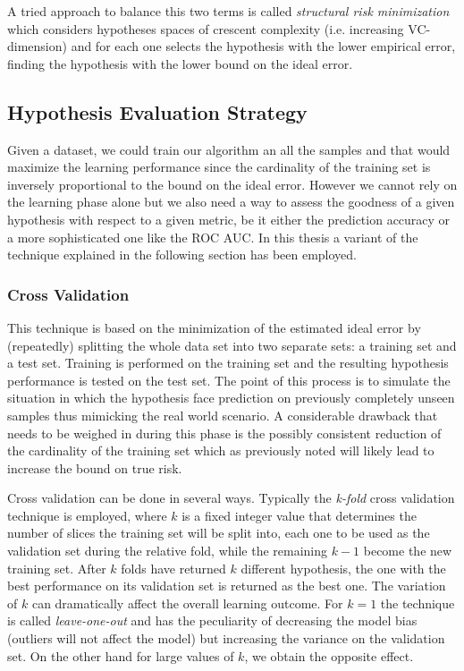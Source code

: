 A tried approach to balance this two terms is called \emph{structural risk
minimization} which considers hypotheses spaces of crescent complexity
(i.e. increasing VC-dimension) and for each one selects the hypothesis with
the lower empirical error, finding the hypothesis with the lower bound on the
ideal error.

\subsection{Hypothesis Evaluation Strategy}
\label{subsec:evaluation}

Given a dataset, we could train our algorithm an all the samples and that would
maximize the learning performance since the cardinality of the training set is
inversely proportional to the bound on the ideal error.
However we cannot rely on the learning phase alone but we also need a way to
assess the goodness of a given hypothesis with respect to a given metric, be it 
either the prediction accuracy or a more sophisticated one like the ROC AUC.
In this thesis a variant of the technique explained in the following section
has been employed.

\subsubsection{Cross Validation}
\label{subsubsec:cv}
This technique is based on the minimization of the estimated ideal error by
(repeatedly) splitting the whole data set into two separate sets: a training set
and a test set.
Training is performed on the training set and the resulting hypothesis performance
is tested on the test set.
The point of this process is to simulate the situation in which the hypothesis
face prediction on previously completely unseen samples thus mimicking the real
world scenario.
A considerable drawback that needs to be weighed in during this phase is the 
possibly consistent reduction of the cardinality of the training set which as 
previously noted will likely lead to increase the bound on true risk.

Cross validation can be done in several ways. Typically the \emph{k-fold} cross
validation technique is employed, where $k$ is a fixed integer value that
determines the number of slices the training set will be split into, each one to
be used as the validation set during the relative fold, while the remaining $k-1$
become the new training set.
After $k$ folds have returned $k$ different hypothesis, the one with the best
performance on its validation set is returned as the best one.
The variation of $k$ can dramatically affect the overall learning outcome.
For $k=1$ the technique is called \emph{leave-one-out} and has the peculiarity
of decreasing the model bias (outliers will not affect the model) but increasing
the variance on the validation set.
On the other hand for large values of $k$, we obtain the opposite effect.

